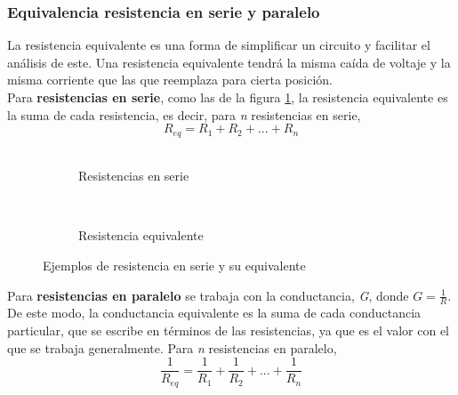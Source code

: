 \subsubsection{Equivalencia resistencia en serie y paralelo}

 
La resistencia equivalente es una forma de simplificar un circuito y facilitar el análisis de este. Una resistencia equivalente tendrá la misma caída de voltaje y la misma corriente que las que reemplaza para cierta posición.
\\

Para \textbf{resistencias en serie}, como las de la figura \ref{fig:rSerie}, la resistencia equivalente es la suma de cada resistencia, es decir, para \textit{n} resistencias en serie,
\begin {equation*}
    R_{eq} = R_1 + R_2 + ... + R_n
\end {equation*}\\

\begin{figure}[h]
     \centering
     \begin{subfigure}{0.35\textwidth}
         
         \caption{Resistencias en serie}
         
     \end{subfigure}\hspace{1em}
     \begin{subfigure}{0.35\textwidth}         
         
        \
         \caption{Resistencia equivalente}        
     \end{subfigure}
     
     
        \caption{Ejemplos de resistencia en serie y su equivalente}
        
        \label{fig:rSerie}
\end{figure}

\indent Para \textbf{resistencias en paralelo} se trabaja con la conductancia, \textit{G}, donde $G = \frac{1}{R}$. De este modo, la conductancia equivalente es la suma de cada conductancia particular, que se escribe en términos de las resistencias, ya que es el valor con el que se trabaja generalmente. Para \textit{n} resistencias en paralelo,
\begin {equation*}\label{eq:resispar2}
    \frac{1}{R_{eq}} = \frac{1}{R_1} + \frac{1}{R_2} + ... + \frac{1}{R_n}
\end {equation*}
\\


